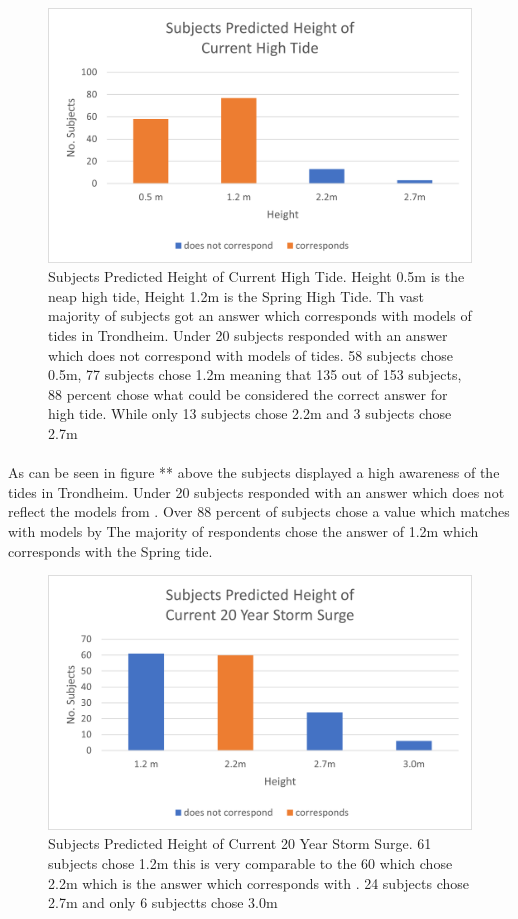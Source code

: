 \begin{figure}[h!]
    \centering
    \includegraphics{fig_results/2022-hightide-answers.png}
    \caption{Subjects Predicted Height of Current High Tide. Height 0.5m is the neap high tide, Height 1.2m is the Spring High Tide. Th vast majority of subjects got an answer which corresponds with models of tides in Trondheim. Under 20 subjects responded with an answer which does not correspond with models of tides. 58 subjects chose 0.5m, 77 subjects chose 1.2m meaning that 135 out of 153 subjects, 88 percent chose what could be considered the correct answer for high tide. While only 13 subjects chose 2.2m and 3 subjects chose 2.7m}
    \label{fig:high-tide-answer}
\end{figure}
\paragraph{}
As can be seen in figure ** above the subjects displayed a high awareness of the tides in Trondheim. Under 20 subjects responded with an answer which does not reflect the models from \cite{kartverket_se_2021}. Over 88 percent of subjects chose a value which matches with models by \cite{kartverket_se_2021} The majority of respondents chose the answer of 1.2m which corresponds with the Spring tide. 

\begin{figure}[h!]
    \centering
    \includegraphics{fig_results/2022-20yrss-answer.png}
    \caption{Subjects Predicted Height of Current 20 Year Storm Surge. 61 subjects chose 1.2m this is very comparable to the 60 which chose 2.2m which is the answer which corresponds with \cite{kartverket_se_2021}. 24 subjects chose 2.7m and only 6 subjectts chose 3.0m}
    \label{fig:2022-stormsurge-answers}
\end{figure}
